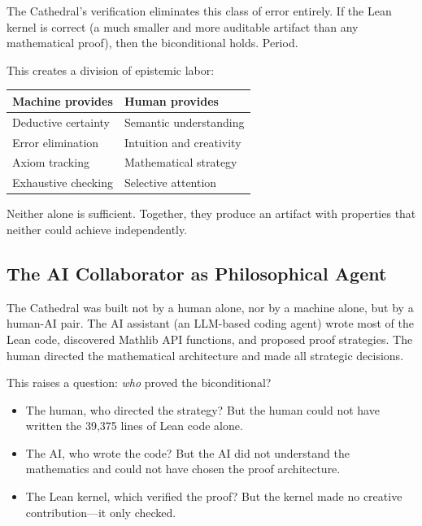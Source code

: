 \documentclass[11pt,a4paper]{article}
\begin{document}
The Cathedral's verification eliminates this class of error entirely.
If the Lean kernel is correct (a much smaller and more auditable
artifact than any mathematical proof), then the biconditional holds.
Period.

This creates a division of epistemic labor:

\begin{center}
\begin{tabular}{@{}ll@{}}
\toprule
\textbf{Machine provides} & \textbf{Human provides} \\
\midrule
Deductive certainty & Semantic understanding \\
Error elimination & Intuition and creativity \\
Axiom tracking & Mathematical strategy \\
Exhaustive checking & Selective attention \\
\bottomrule
\end{tabular}
\end{center}

Neither alone is sufficient. Together, they produce an artifact with
properties that neither could achieve independently.

\subsection{The AI Collaborator as Philosophical Agent}

The Cathedral was built not by a human alone, nor by a machine alone,
but by a human-AI pair. The AI assistant (an LLM-based coding agent)
wrote most of the Lean code, discovered Mathlib API functions,
and proposed proof strategies. The human directed the mathematical
architecture and made all strategic decisions.

This raises a question: \emph{who} proved the biconditional?

\begin{itemize}
  \item The human, who directed the strategy? But the human could not
    have written the 39,375 lines of Lean code alone.
  \item The AI, who wrote the code? But the AI did not understand
    the mathematics and could not have chosen the proof architecture.
  \item The Lean kernel, which verified the proof? But the kernel
    made no creative contribution---it only checked.
\end{itemize}
\end{document}
